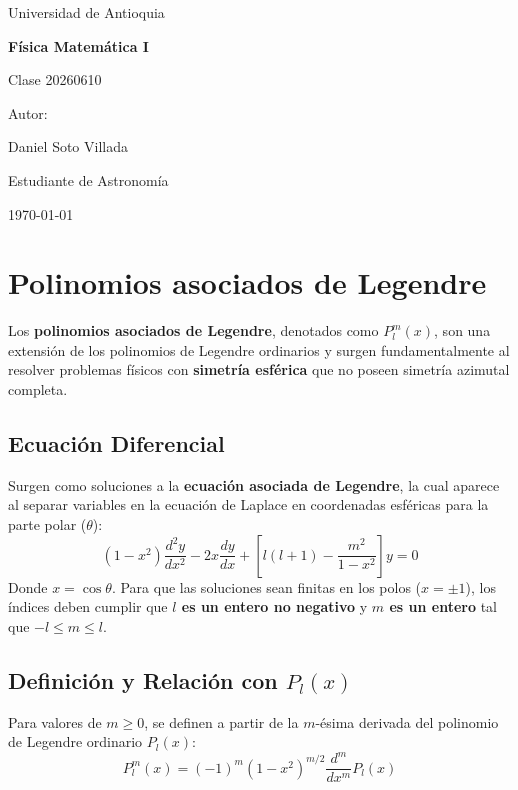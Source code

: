 \documentclass[a4paper]{article}
\begin{document}
\begin{titlepage}
  \centering
  {\Large Universidad de Antioquia\par}
  \vspace{2cm}
  {\huge\bfseries Física Matemática I\par}
  \vspace{0.4cm}
  {\Large Clase 20260610\par}
  \vspace{2.5cm}
  {\large Autor:\par}
  \vspace{0.2cm}
  {\large Daniel Soto Villada\par}
  {\large Estudiante de Astronomía\par}
  \vfill
  {\large \today\par}
\end{titlepage}

\newpage
\tableofcontents
\newpage

\section{Polinomios asociados de Legendre}

Los \textbf{polinomios asociados de Legendre}, denotados como $P_l^m(x)$, son una extensión de los polinomios de Legendre ordinarios y surgen fundamentalmente al resolver problemas físicos con \textbf{simetría esférica} que no poseen simetría azimutal completa.

\subsection{Ecuación Diferencial}
Surgen como soluciones a la \textbf{ecuación asociada de Legendre}, la cual aparece al separar variables en la ecuación de Laplace en coordenadas esféricas para la parte polar ($\theta$):
    $$(1-x^2)\frac{d^2y}{dx^2} - 2x\frac{dy}{dx} + \left[ l(l+1) - \frac{m^2}{1-x^2} \right]y = 0$$
    Donde $x = \cos \theta$. Para que las soluciones sean finitas en los polos ($x = \pm 1$), los índices deben cumplir que \textbf{$l$ es un entero no negativo} y \textbf{$m$ es un entero} tal que $-l \leq m \leq l$.


\subsection{Definición y Relación con $P_l(x)$}
Para valores de $m \geq 0$, se definen a partir de la $m$-ésima derivada del polinomio de Legendre ordinario $P_l(x)$:
    $$P_l^m(x) = (-1)^m (1-x^2)^{m/2} \frac{d^m}{dx^m} P_l(x)$$
    
\end{document}
